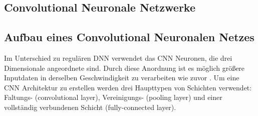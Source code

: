 \documentclass[twosided,a4,10pt]{article}
\begin{document}
\begin{multicols}{2}
\section{Convolutional Neuronale Netzwerke}

\subsection{Aufbau eines Convolutional Neuronalen Netzes}
Im Unterschied zu regulären DNN verwendet das CNN Neuronen, die drei Dimensionale angeordnete sind. Durch diese Anordnung ist es möglich größere Inputdaten in derselben Geschwindigkeit zu verarbeiten wie zuvor \cite{karpathy}. Um eine CNN Architektur zu erstellen werden drei Haupttypen von Schichten verwendet: Faltungs- (convolutional layer), Vereinigungs- (pooling layer) und einer vollständig verbundenen Schicht (fully-connected layer).


\end{multicols}
\end{document}
